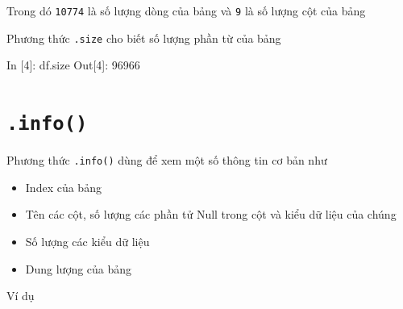 \documentclass[
]{book}
\newenvironment{Shaded}{\begin{snugshade}}{\end{snugshade}}
\newcommand{\DecValTok}[1]{\textcolor[rgb]{0.00,0.00,0.81}{#1}}
\newcommand{\NormalTok}[1]{#1}
\providecommand{\tightlist}{%
  \setlength{\itemsep}{0pt}\setlength{\parskip}{0pt}}
\begin{document}
Trong dó \texttt{10774} là số lượng dòng của bảng và \texttt{9} là số lượng cột của bảng

Phương thức \texttt{.size} cho biết số lượng phần từ của bảng

\begin{Shaded}
\begin{Highlighting}[]
\NormalTok{ In [}\DecValTok{4}\NormalTok{]: df.size}
\NormalTok{ Out[}\DecValTok{4}\NormalTok{]: }\DecValTok{96966}
\end{Highlighting}
\end{Shaded}

\section{\texorpdfstring{\texttt{.info()}}{.info()}}\label{info}

Phương thức \texttt{.info()} dùng để xem một số thông tin cơ bản như

\begin{itemize}
\tightlist
\item
  Index của bảng
\item
  Tên các cột, số lượng các phần tử Null trong cột và kiểu dữ liệu của chúng
\item
  Số lượng các kiểu dữ liệu
\item
  Dung lượng của bảng
\end{itemize}

Ví dụ
\end{document}
